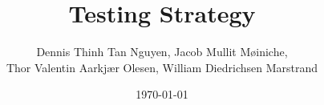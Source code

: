 \documentclass{article}
\author{Dennis Thinh Tan Nguyen, Jacob Mullit M{\o}iniche,\\
 		Thor Valentin Aarkjær Olesen, William Diedrichsen Marstrand}
\date{\today}
\title{Testing Strategy}
\begin{document}
\maketitle
\pagebreak
\tableofcontents
\pagebreak






\end{document}
